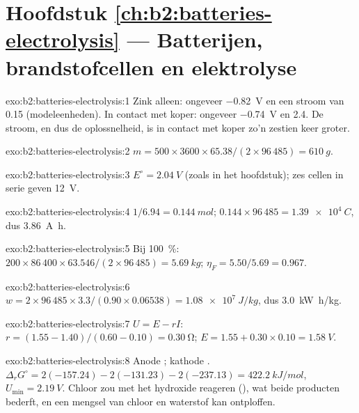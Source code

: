 \section*{Hoofdstuk \ref{ch:b2:batteries-electrolysis} --- Batterijen, brandstofcellen en elektrolyse}

\begin{solution}{exo:b2:batteries-electrolysis:1}
Zink alleen: ongeveer \qty{-0.82}{V} en een stroom van 0.15 (modeleenheden). In contact
met koper: ongeveer \qty{-0.74}{V} en 2.4. De stroom, en dus de oplossnelheid, is
in contact met koper zo'n zestien keer groter.
\end{solution}

\begin{solution}{exo:b2:batteries-electrolysis:2}
$m = 500 \times 3600 \times 65.38/(2 \times 96\,485) = \qty{610}{g}$.
\end{solution}

\begin{solution}{exo:b2:batteries-electrolysis:3}
$E^\circ = \qty{2.04}{V}$ (zoals in het hoofdstuk); zes cellen in serie geven
\qty{12}{V}.
\end{solution}

\begin{solution}{exo:b2:batteries-electrolysis:4}
$1/6.94 = \qty{0.144}{mol}$; $0.144 \times 96\,485 = \qty{1.39e4}{C}$, dus
\qty{3.86}{A.h}.
\end{solution}

\begin{solution}{exo:b2:batteries-electrolysis:5}
Bij 100~\%: $200 \times 86\,400 \times 63.546/(2 \times 96\,485) = \qty{5.69}{kg}$;
$\eta_F = 5.50/5.69 = 0.967$.
\end{solution}

\begin{solution}{exo:b2:batteries-electrolysis:6}
$w = 2 \times 96\,485 \times 3.3/(0.90 \times 0.06538) = \qty{1.08e7}{J/kg}$, dus
\qty{3.0}{kW.h/kg}.
\end{solution}

\begin{solution}{exo:b2:batteries-electrolysis:7}
$U = E - rI$: $r = (1.55 - 1.40)/(0.60 - 0.10) = \qty{0.30}{\ohm}$; $E = 1.55 + 0.30
\times 0.10 = \qty{1.58}{V}$.
\end{solution}

\begin{solution}{exo:b2:batteries-electrolysis:8}
Anode ; kathode . $\Delta_r G^\circ =
2(-157.24) - 2(-131.23) - 2(-237.13) = \qty{422.2}{kJ/mol}$, $U_{\min} =
\qty{2.19}{V}$. Chloor zou met het hydroxide reageren (), wat beide producten bederft, en een mengsel van chloor en waterstof
kan ontploffen.
\end{solution}

